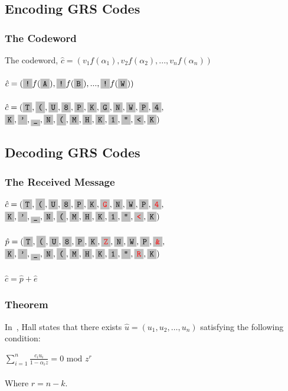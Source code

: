 \documentclass{beamer}
\begin{document}
\subsection{Encoding GRS Codes}

\begin{frame}
	\frametitle{The Codeword}
	The codeword, $\hat{c} = (v_{1}f(\alpha_{1}),v_{2}f(\alpha_{2}),...,v_{n}f(\alpha_{n}))$\\~\\
	$\hat{c} = (\f{!}f(\f{A}),\f{!}f(\f{B}),...,\f{!}f(\f{W}))$\\~\\
	$\hat{c} = (\f{T}, \f{(}, \f{U}, \f{8}, \f{P}, \f{K}, \f{G}, \f{N}, \f{W}, \f{P}, \f{4}, $\\
    \hspace*{4.5ex}   $\f{K}, \f{'}, \f{\_}, \f{N}, \f{(}, \f{M}, \f{H}, \f{K}, \f{1}, \f{"}, \f{<}, \f{K})$
	
\end{frame}

\subsection{Decoding GRS Codes}

\begin{frame}
	\frametitle{The Received Message}
    
    $\hat{c} = (\f{T}, \f{(}, \f{U}, \f{8}, \f{P}, \f{K}, \f{\textcolor{red}{G}}, \f{N}, \f{W}, \f{P}, \f{\textcolor{red}{4}}, $\\
    \hspace*{4.5ex}   $\f{K}, \f{'}, \f{\_}, \f{N}, \f{(}, \f{M}, \f{H}, \f{K}, \f{1}, \f{"}, \f{\textcolor{red}{<}}, \f{K})$\\~\\
	
	$\hat{p} = (\f{T}, \f{(}, \f{U}, \f{8}, \f{P}, \f{K}, \f{\textcolor{red}{Z}}, \f{N}, \f{W}, \f{P}, \f{\textcolor{red}{\&}}, $\\
    \hspace*{4.5ex}   $\f{K}, \f{'}, \f{\_}, \f{N}, \f{(}, \f{M}, \f{H}, \f{K}, \f{1}, \f{"}, \f{\textcolor{red}{R}}, \f{K})$\\~\\
   
    $\hat{c} = \hat{p} + \hat{e}$

\end{frame}

\begin{frame}
	\frametitle{Theorem}
    In~\cite{Hall:2012}, Hall states that there exists $\hat{u} = (u_1, u_2, \ldots, u_n)$ satisfying the following condition:
    
    $\sum\limits_{i=1}^{n} \frac{c_{i}u_{i}}{1 - \alpha_{i}z} = 0 \text{ mod } z^{r}$\\~\\
    
    Where $r = n - k$.
    
\end{frame}
\end{document}
